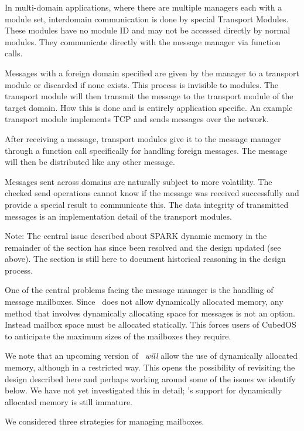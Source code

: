In multi-domain applications, where there are multiple managers each with a module set, interdomain communication is done by special Transport Modules. These modules have no module ID and may not be accessed directly by normal modules. They communicate directly with the message manager via function calls.

Messages with a foreign domain specified are given by the manager to a transport module or discarded if none exists. This process is invisible to modules. The transport module will then transmit the message to the transport module of the target domain. How this is done and is entirely application specific. An example transport module implements TCP and sends messages over the network.

After receiving a message, transport modules give it to the message manager through a function call specifically for handling foreign messages. The message will then be distributed like any other message.

Messages sent across domains are naturally subject to more volatility. The checked send operations cannot know if the message was received successfully and provide a special result to communicate this. The data integrity of transmitted messages is an implementation detail of the transport modules.


\pet Note: The central issue described about SPARK dynamic memory in the remainder of the section has since been resolved and the design updated (see above). The section is still here to document historical reasoning in the design process.

One of the central problems facing the message manager is the handling of message mailboxes.
Since \SPARK\ does not allow dynamically allocated memory, any method that involves dynamically
allocating space for messages is not an option. Instead mailbox space must be allocated
statically. This forces users of CubedOS to anticipate the maximum sizes of the mailboxes they
require.

We note that an upcoming version of \SPARK\ \emph{will} allow the use of dynamically allocated
memory, although in a restricted way. This opens the possibility of revisiting the design
described here and perhaps working around some of the issues we identify below. We have not yet
investigated this in detail; \SPARK's support for dynamically allocated memory is still
immature.

We considered three strategies for managing mailboxes.

